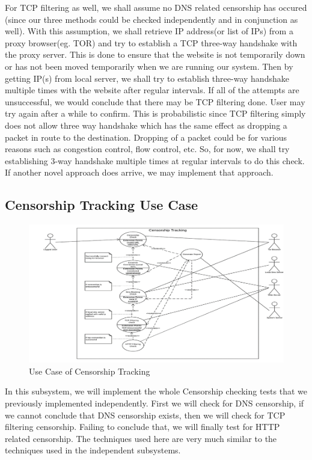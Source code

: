 \documentclass[12pt]{article}
\begin{document}
For TCP filtering as well, we shall assume no DNS related censorship has occured (since our three methods could be checked independently and in conjunction as well). With this assumption, we shall retrieve IP address(or list of IPs) from a proxy browser(eg. TOR) and try to establish a TCP three-way handshake with the proxy server. This is done to ensure that the website is not temporarily down or has not been moved temporarily when we are running our system. Then by getting IP(s) from local server, we shall try to establish three-way handshake multiple times with the website after regular intervals. If all of the attempts are unsuccessful, we would conclude that there may be TCP filtering done. User may try again after a while to confirm. This is probabilistic since TCP filtering simply does not allow three way handshake which has the same effect as dropping a packet in route to the destination. Dropping of a packet could be for various reasons such as congestion control, flow control, etc. So, for now, we shall try establishing 3-way handshake multiple times at regular intervals to do this check. If another novel approach does arrive, we may implement that approach.

\newpage
\subsection{Censorship Tracking Use Case}
\begin{figure}[h]
    \centering
    \includegraphics[width=\textwidth]{ucct.png}
    \caption{Use Case of Censorship Tracking}
    \label{fig:ucct}
\end{figure}
In this subsystem, we will implement the whole Censorship checking tests that we previously implemented independently. First we will check for DNS censorship, if we cannot conclude that DNS censorship exists, then we will check for TCP filtering censorship. Failing to conclude that, we will finally test for HTTP related censorship. The techniques used here are very much similar to the techniques used in the independent subsystems. 
\end{document}
